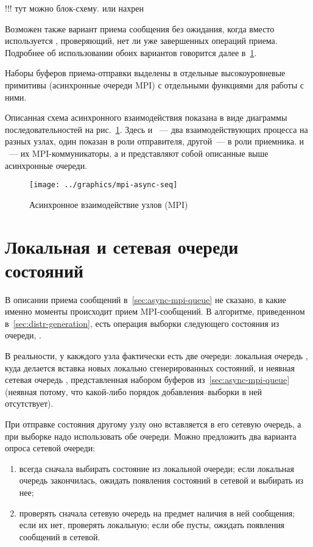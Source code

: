 !!! тут можно блок-схему. или нахрен

Возможен также вариант приема сообщения без ожидания, когда вместо 
используется , проверяющий, нет ли уже завершенных операций
приема. Подробнее об использовании обоих вариантов говорится далее
в~\ref{sec:local-network-queue}.

Наборы буферов приема-отправки выделены в отдельные высокоуровневые примитивы (асинхронные
очереди MPI) с отдельными функциями для работы с ними.

Описанная схема асинхронного взаимодействия показана в виде диаграммы последовательностей
на рис.~\ref{fig:mpi-async-seq}. Здесь  и ~--- два взаимодействующих
процесса на разных узлах, один показан в роли отправителя, другой~--- в роли
приемника.  и ~--- их MPI-коммуникаторы, а  и 
представляют собой описанные выше асинхронные очереди.

\begin{figure}[ht]
  \centering
  \texttt{[image: ../graphics/mpi-async-seq]}  
  \caption{Асинхронное взаимодействие узлов (MPI)}
  \label{fig:mpi-async-seq}
\end{figure}

\section{Локальная и сетевая очереди состояний}
\label{sec:local-network-queue}

В описании приема сообщений в~\ref{sec:async-mpi-queue} не сказано, в какие именно моменты
происходит прием MPI-сообщений. В алгоритме, приведенном в~\ref{sec:distr-generation},
есть операция выборки следующего состояния из очереди, .

В реальности, у какждого узла фактически есть две очереди: локальная очередь
, куда делается вставка новых локально сгенерированных состояний, и
неявная сетевая очередь , представленная набором буферов
из~\ref{sec:async-mpi-queue} (неявная потому, что какой-либо порядок добавления--выборки в
ней отсутствует). 

При отправке состояния другому узлу оно вставляется в его сетевую очередь, а при выборке
надо использовать обе очереди. Можно предложить два варианта опроса сетевой очереди:
\begin{enumerate}
\item всегда сначала выбирать состояние из локальной очереди; если локальная очередь
  закончилась, ожидать появления состояний в сетевой и выбирать из нее;
\item проверять сначала сетевую очередь на предмет наличия в ней сообщения; если их нет,
  проверять локальную; если обе пусты, ожидать появления сообщений в сетевой.
\end{enumerate}


